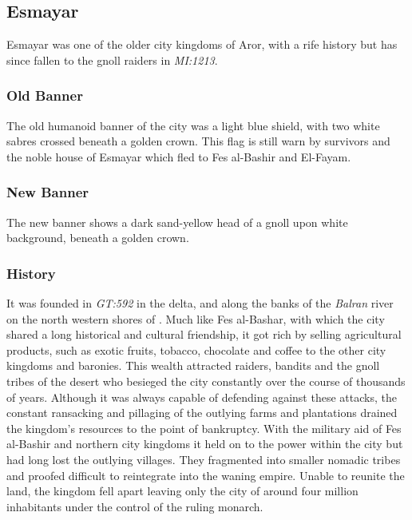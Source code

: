 \subsection{Esmayar}
\label{sec:Esmayar}

Esmayar was one of the older city kingdoms of Aror, with a rife history but has
since fallen to the gnoll raiders in \emph{MI:1213}.

\subsubsection{Old Banner}

The old humanoid banner of the city was a light blue shield, with two white
sabres crossed beneath a golden crown. This flag is still warn by survivors and
the noble house of Esmayar which fled to Fes al-Bashir and El-Fayam.

\subsubsection{New Banner}

The new banner shows a dark sand-yellow head of a gnoll upon white background,
beneath a golden crown.

\subsubsection{History}

It was founded in \emph{GT:592} in the delta, and along the banks of the
\emph{Balran} river on the north western shores of . Much
like Fes al-Bashar, with which the city shared a long historical and cultural
friendship, it got rich by selling agricultural products, such as exotic
fruits, tobacco, chocolate and coffee to the other city kingdoms and
baronies. This wealth attracted raiders, bandits and the gnoll tribes of the
desert who besieged the city constantly over the course of thousands of
years. Although it was always capable of defending against these attacks, the
constant ransacking and pillaging of the outlying farms and plantations
drained the kingdom's resources to the point of bankruptcy. With the military
aid of Fes al-Bashir and northern city kingdoms it held on to the power within
the city but had long lost the outlying villages. They fragmented into smaller
nomadic tribes and proofed difficult to reintegrate into the waning
empire. Unable to reunite the land, the kingdom fell apart leaving only the
city of around four million inhabitants under the control of the ruling
monarch.

